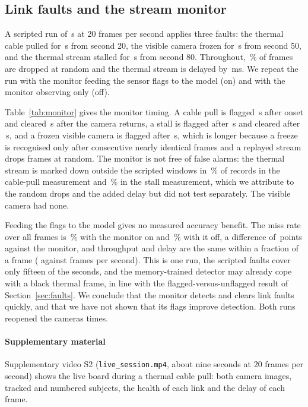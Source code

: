 \subsection{Link faults and the stream monitor}
\label{sec:linkfaults}
A scripted run of \cfgLinkSeconds{}\,s at 20 frames per second applies three faults: the thermal cable pulled for \cfgUnplugSeconds{}\,s from second 20, the visible camera frozen for \cfgUnplugSeconds{}\,s from second 50, and the thermal stream stalled for \cfgStallSeconds{}\,s from second 80. Throughout, \cfgLinkDropPercent{}\,\% of frames are dropped at random and the thermal stream is delayed by \cfgLinkDelayMs{}\,ms. We repeat the run with the monitor feeding the sensor flags to the model (on) and with the monitor observing only (off).



Table~\ref{tab:monitor} gives the monitor timing. A cable pull is flagged \livFaultOnUnpluggedDetectS{}\,s after onset and cleared \livFaultOnUnpluggedRecoverS{}\,s after the camera returns, a stall is flagged after \livFaultOnStalledDetectS{}\,s and cleared after \livFaultOnStalledRecoverS{}\,s, and a frozen visible camera is flagged after \livFaultOnFrozenDetectS{}\,s, which is longer because a freeze is recognised only after consecutive nearly identical frames and a replayed stream drops frames at random. The monitor is not free of false alarms: the thermal stream is marked down outside the scripted windows in \livFaultOnUnpluggedFalseAlarmPercent{}\,\% of records in the cable-pull measurement and \livFaultOnStalledFalseAlarmPercent{}\,\% in the stall measurement, which we attribute to the random drops and the added delay but did not test separately. The visible camera had none.

Feeding the flags to the model gives no measured accuracy benefit. The miss rate over all frames is \livFaultOnMr{}\,\% with the monitor on and \livFaultOffMr{}\,\% with it off, a difference of \livFaultMrChange{}\,points against the monitor, and throughput and delay are the same within a fraction of a frame (\livFaultOnFps{} against \livFaultOffFps{} frames per second). This is one run, the scripted faults cover only fifteen of the \cfgLinkSeconds{} seconds, and the memory-trained detector may already cope with a black thermal frame, in line with the flagged-versus-unflagged result of Section~\ref{sec:faults}. We conclude that the monitor detects and clears link faults quickly, and that we have not shown that its flags improve detection. Both runs reopened the cameras \livFaultOnReconnects{} times.

\paragraph{Supplementary material}
Supplementary video S2 (\texttt{live\_session.mp4}, about nine seconds at 20 frames per second) shows the live board during a thermal cable pull: both camera images, tracked and numbered subjects, the health of each link and the delay of each frame.
